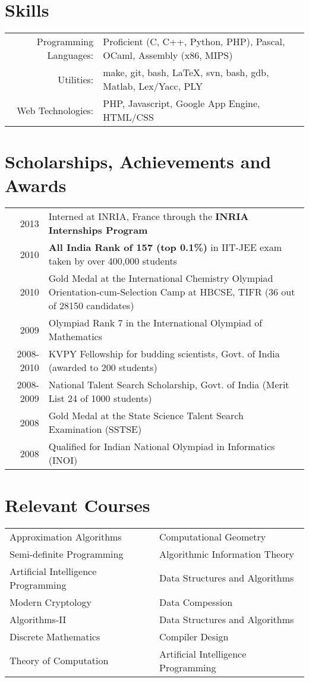 \documentclass[a4paper,10pt]{article}
\begin{document}
\section{Skills}
\begin{tabular}{rl}
Programming Languages: & Proficient (C, C++, Python, PHP), Pascal, OCaml, Assembly (x86, MIPS)\\
Utilities: & make, git, bash, \LaTeX, svn, bash, gdb, Matlab, Lex/Yacc, PLY\\
Web Technologies: & PHP, Javascript, Google App Engine, HTML/CSS\\
\end{tabular}

\section{Scholarships, Achievements and Awards}
\begin{tabular}{rp{13cm}}
2013 & Interned at INRIA, France through the \textbf{INRIA Internships Program}\\
2010 & \textbf{All India Rank of 157 (top 0.1\%)} in IIT-JEE exam taken by over 400,000 students\\
2010 & Gold Medal at the International Chemistry Olympiad Orientation-cum-Selection Camp at HBCSE, TIFR (36 out of 28150 candidates)\\
2009 & Olympiad Rank 7 in the International Olympiad of Mathematics\\
2008-2010 & KVPY Fellowship for budding scientists, Govt. of India (awarded to 200 students)\\
2008-2009 & National Talent Search Scholarship, Govt. of India (Merit List 24 of 1000 students)\\
2008 & Gold Medal at the State Science Talent Search Examination (SSTSE)\\
2008 & Qualified for Indian National Olympiad in Informatics (INOI)
\end{tabular}

\section{Relevant Courses}
\begin{tabular}{ll}
Approximation Algorithms & Computational Geometry\\
Semi-definite Programming & Algorithmic Information Theory\\
Artificial Intelligence Programming & Data Structures and Algorithms\\
Modern Cryptology & Data Compession\\
Algorithms-II & Data Structures and Algorithms\\
Discrete Mathematics & Compiler Design\\
Theory of Computation & Artificial Intelligence Programming
\end{tabular}
\end{document}
